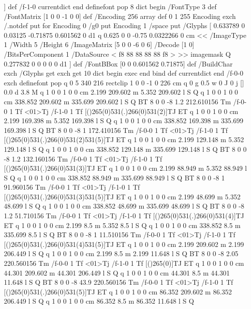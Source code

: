 ] def
/f-1-0 currentdict end definefont pop
8 dict begin
/FontType 3 def
/FontMatrix [1 0 0 -1 0 0] def
/Encoding 256 array def
0 1 255 { Encoding exch /.notdef put } for
Encoding 0 /g0 put
Encoding 1 /space put
/Glyphs [
    { %
0.633789 0 0.03125 -0.71875 0.601562 0 d1
q 0.625 0 0 -0.75 0.0322266 0 cm
<<
   /ImageType 1
   /Width 5
   /Height 6
   /ImageMatrix [5 0 0 -6 0 6]
   /Decode [1 0]
   /BitsPerComponent 1
   /DataSource {<
   f8 
   88 
   88 
   88 
   88 
   f8 
   >}
>>
imagemask
Q
    }
    { %
0.277832 0 0 0 0 0 d1
    }
] def
/FontBBox [0 0 0.601562 0.71875] def
/BuildChar {
  exch /Glyphs get
  exch get
  10 dict begin exec end
} bind def
currentdict
end
/f-0-0 exch definefont pop
q 0 5 340 216 rectclip
1 0 0 -1 0 226 cm q
0 g
0.5 w
0 J
0 j
[] 0.0 d
3.8 M q 1 0 0 1 0 0 cm
2.199 209.602 m 5.352 209.602 l S Q
q 1 0 0 1 0 0 cm
338.852 209.602 m 335.699 209.602 l S Q
BT
8 0 0 -8 1.2 212.610156 Tm
/f-0-0 1 Tf
<01>Tj
/f-1-0 1 Tf
[()265(0)531(.)266(0)531(2)]TJ
ET
q 1 0 0 1 0 0 cm
2.199 169.398 m 5.352 169.398 l S Q
q 1 0 0 1 0 0 cm
338.852 169.398 m 335.699 169.398 l S Q
BT
8 0 0 -8 1 172.410156 Tm
/f-0-0 1 Tf
<01>Tj
/f-1-0 1 Tf
[()265(0)531(.)266(0)531(2)531(5)]TJ
ET
q 1 0 0 1 0 0 cm
2.199 129.148 m 5.352 129.148 l S Q
q 1 0 0 1 0 0 cm
338.852 129.148 m 335.699 129.148 l S Q
BT
8 0 0 -8 1.2 132.160156 Tm
/f-0-0 1 Tf
<01>Tj
/f-1-0 1 Tf
[()265(0)531(.)266(0)531(3)]TJ
ET
q 1 0 0 1 0 0 cm
2.199 88.949 m 5.352 88.949 l S Q
q 1 0 0 1 0 0 cm
338.852 88.949 m 335.699 88.949 l S Q
BT
8 0 0 -8 1 91.960156 Tm
/f-0-0 1 Tf
<01>Tj
/f-1-0 1 Tf
[()265(0)531(.)266(0)531(3)531(5)]TJ
ET
q 1 0 0 1 0 0 cm
2.199 48.699 m 5.352 48.699 l S Q
q 1 0 0 1 0 0 cm
338.852 48.699 m 335.699 48.699 l S Q
BT
8 0 0 -8 1.2 51.710156 Tm
/f-0-0 1 Tf
<01>Tj
/f-1-0 1 Tf
[()265(0)531(.)266(0)531(4)]TJ
ET
q 1 0 0 1 0 0 cm
2.199 8.5 m 5.352 8.5 l S Q
q 1 0 0 1 0 0 cm
338.852 8.5 m 335.699 8.5 l S Q
BT
8 0 0 -8 1 11.510156 Tm
/f-0-0 1 Tf
<01>Tj
/f-1-0 1 Tf
[()265(0)531(.)266(0)531(4)531(5)]TJ
ET
q 1 0 0 1 0 0 cm
2.199 209.602 m 2.199 206.449 l S Q
q 1 0 0 1 0 0 cm
2.199 8.5 m 2.199 11.648 l S Q
BT
8 0 0 -8 2.05 220.560156 Tm
/f-0-0 1 Tf
<01>Tj
/f-1-0 1 Tf
[()265(0)]TJ
ET
q 1 0 0 1 0 0 cm
44.301 209.602 m 44.301 206.449 l S Q
q 1 0 0 1 0 0 cm
44.301 8.5 m 44.301 11.648 l S Q
BT
8 0 0 -8 43.9 220.560156 Tm
/f-0-0 1 Tf
<01>Tj
/f-1-0 1 Tf
[()265(0)531(.)266(0)531(5)]TJ
ET
q 1 0 0 1 0 0 cm
86.352 209.602 m 86.352 206.449 l S Q
q 1 0 0 1 0 0 cm
86.352 8.5 m 86.352 11.648 l S Q
